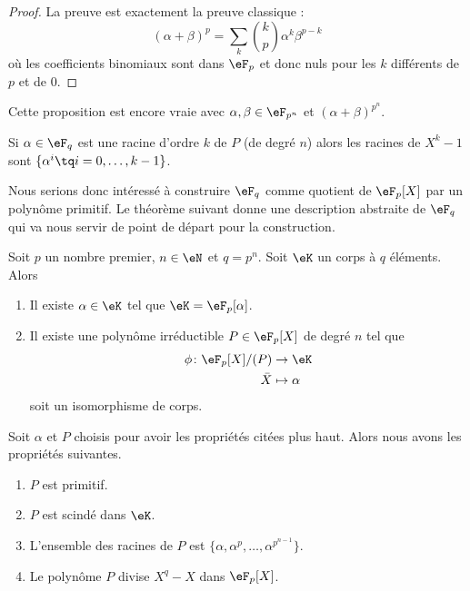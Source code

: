 \begin{proof}
    La preuve est exactement la preuve classique :
    \begin{equation}
        (\alpha+\beta)^p=\sum_k{k\choose p} \alpha^k\beta^{p-k}
    \end{equation}
    où les coefficients binomiaux sont dans \( \eF_p\) et donc nuls pour les \( k\) différents de \( p\) et de \( 0\).
\end{proof}
Cette proposition est encore vraie avec \( \alpha,\beta\in\eF_{p^n}\) et \( (\alpha+\beta)^{p^n}\).

\begin{lemma}
    Si \( \alpha\in \eF_q\) est une racine d'ordre \( k\) de \( P\) (de degré \( n\)) alors les racines de \( X^k-1\) sont \( \{ \alpha^i\tq i=0,\ldots, k-1 \}\).
\end{lemma}

Nous serions donc intéressé à construire $\eF_{q}$ comme quotient de \( \eF_p[X]\) par un polynôme primitif. Le théorème suivant donne une description abstraite de \( \eF_q\) qui va nous servir de point de départ pour la construction.
\begin{theorem}    \label{ThoqSludu}
    Soit \( p\) un nombre premier, \( n\in \eN\) et \( q=p^n\). Soit \( \eK\) un corps à \( q\) éléments. Alors
    \begin{enumerate}
        \item
            Il existe \( \alpha\in \eK\) tel que \( \eK=\eF_p[\alpha]\).
        \item
            Il existe une polynôme irréductible \( P\in\eF_p[X]\) de degré \( n\) tel que
            \begin{equation}        \label{EqWlMhhm}
                \begin{aligned}
                    \phi\colon \eF_p[X]/(P)&\to \eK \\
                    \bar X&\mapsto \alpha 
                \end{aligned}
            \end{equation}
            soit un isomorphisme de corps.
    \end{enumerate}
    Soit \( \alpha\) et \( P\) choisis pour avoir les propriétés citées plus haut. Alors nous avons les propriétés suivantes.
    \begin{enumerate}
        \item
            \( P\) est primitif.
        \item
            \( P\) est scindé dans \( \eK\).
        \item
            L'ensemble des racines de \( P\) est \( \{ \alpha,\alpha^p,\ldots, \alpha^{p^{n-1}} \}\).
        \item
            Le polynôme \( P\) divise \( X^q-X\) dans \( \eF_p[X]\).
    \end{enumerate}
\end{theorem}

